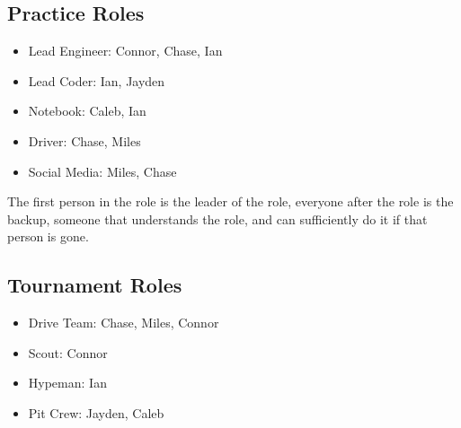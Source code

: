\subsection*{Practice Roles}
\begin{itemize}
    \item Lead Engineer: Connor, Chase, Ian
    \item Lead Coder: Ian, Jayden
    \item Notebook: Caleb, Ian
    \item Driver: Chase, Miles
    \item Social Media: Miles, Chase
\end{itemize}
The first person in the role is the leader of the role, everyone after the role is the backup, someone that understands the role, and can sufficiently do it if that person is gone.
\subsection*{Tournament Roles}
\begin{itemize}
    \item Drive Team: Chase, Miles, Connor
    \item Scout: Connor
    \item Hypeman: Ian
    \item Pit Crew: Jayden, Caleb
\end{itemize}
